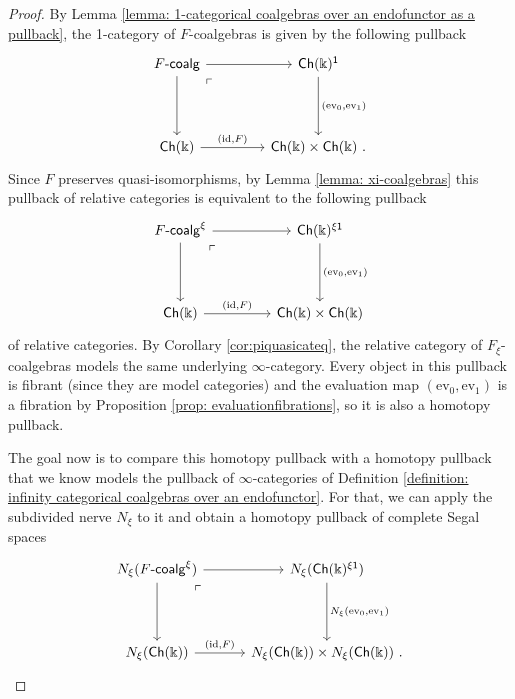 \documentclass[a4paper,12pt]{amsart}
\theoremstyle{plain}
\theoremstyle{definition}
\theoremstyle{remark}
\newcommand{\kk}{\Bbbk}
\begin{document}
\begin{proof}
By Lemma \ref{lemma: 1-categorical coalgebras over an endofunctor as a pullback}, the 1-category of $F$-coalgebras is given by the following pullback 
\[
\begin{tikzcd}[column sep=3.5pc,row sep=3.5pc]
F\text{-}\mathsf{coalg} \arrow[r] \arrow[d] \arrow[dr, phantom, "\ulcorner", very near start]
& \mathsf{Ch}(\kk)^{\mathsf{1}} \arrow[d,"{(\mathrm{ev}_0,\mathrm{ev}_1)}"]  \\
 \mathsf{Ch}(\kk) \arrow[r,"{(\mathrm{id},F)}"]
& \mathsf{Ch}(\kk) \times  \mathsf{Ch}(\kk)~.
\end{tikzcd}
\]
Since $F$ preserves quasi-isomorphisms, by Lemma \ref{lemma: xi-coalgebras} this pullback of relative categories is equivalent to the following pullback 
\[
\begin{tikzcd}[column sep=3.5pc,row sep=3.5pc]
F\text{-}\mathsf{coalg}^{\xi} \arrow[r] \arrow[d] \arrow[dr, phantom, "\ulcorner", very near start]
&\mathsf{Ch}(\kk)^{\xi\mathsf{1}} \arrow[d,"{(\mathrm{ev}_0,\mathrm{ev}_1)}"]  \\
\mathsf{Ch}(\kk) \arrow[r,"{(\mathrm{id},F)}"]
&\mathsf{Ch}(\kk) \times  \mathsf{Ch}(\kk) 
\end{tikzcd}
\]
of relative categories. By Corollary \ref{cor:piquasicateq}, the relative category of $F_\xi$-coalgebras models the same underlying $\infty$-category. Every object in this pullback is fibrant (since they are model categories) and the evaluation map $(\mathrm{ev}_0,\mathrm{ev}_1)$ is a fibration by Proposition \ref{prop: evaluationfibrations}, so it is also a homotopy pullback. 


The goal now is to compare this homotopy pullback with a homotopy pullback that we know models the pullback of $\infty$-categories of Definition \ref{definition: infinity categorical coalgebras over an endofunctor}. For that, we can apply the subdivided nerve $N_\xi$ to it and obtain a homotopy pullback of complete Segal spaces
\[
\begin{tikzcd}[column sep=2.5pc,row sep=3.5pc]
N_{\xi}(F\text{-}\mathsf{coalg}^\xi) \arrow[r] \arrow[d] \arrow[dr, phantom, "\ulcorner", very near start]
& N_{\xi}(\mathsf{Ch}(\kk)^{\xi\mathsf{1}}) \arrow[d,"{ N_{\xi}(\mathrm{ev}_0,\mathrm{ev}_1)}"]  \\
 N_{\xi}(\mathsf{Ch}(\kk)) \arrow[r,"{(\mathrm{id},F)}"]
& N_{\xi}(\mathsf{Ch}(\kk)) \times  N_{\xi}(\mathsf{Ch}(\kk))~.
\end{tikzcd}
\]


\end{proof}
\end{document}
